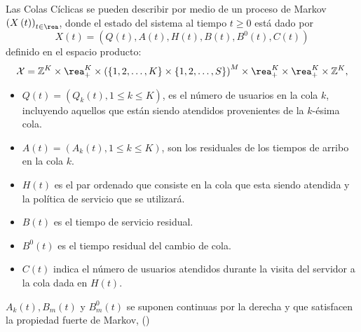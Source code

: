 Las Colas C\'iclicas se pueden describir por medio de un proceso
de Markov $\left(X\left(t\right)\right)_{t\in\rea}$, donde el
estado del sistema al tiempo $t\geq0$ est\'a dado por
\begin{equation}
X\left(t\right)=\left(Q\left(t\right),A\left(t\right),H\left(t\right),B\left(t\right),B^{0}\left(t\right),C\left(t\right)\right)
\end{equation}
definido en el espacio producto:
\begin{equation}
\mathcal{X}=\mathbb{Z}^{K}\times\rea_{+}^{K}\times\left(\left\{1,2,\ldots,K\right\}\times\left\{1,2,\ldots,S\right\}\right)^{M}\times\rea_{+}^{K}\times\rea_{+}^{K}\times\mathbb{Z}^{K},
\end{equation}

\begin{itemize}
\item $Q\left(t\right)=\left(Q_{k}\left(t\right),1\leq k\leq
K\right)$, es el n\'umero de usuarios en la cola $k$, incluyendo
aquellos que est\'an siendo atendidos provenientes de la
$k$-\'esima cola.

\item $A\left(t\right)=\left(A_{k}\left(t\right),1\leq k\leq
K\right)$, son los residuales de los tiempos de arribo en la cola
$k$. \item $H\left(t\right)$ es el par ordenado que consiste en la
cola que esta siendo atendida y la pol\'itica de servicio que se
utilizar\'a.

\item $B\left(t\right)$ es el tiempo de servicio residual.

\item $B^{0}\left(t\right)$ es el tiempo residual del cambio de
cola.

\item $C\left(t\right)$ indica el n\'umero de usuarios atendidos
durante la visita del servidor a la cola dada en
$H\left(t\right)$.
\end{itemize}

$A_{k}\left(t\right),B_{m}\left(t\right)$ y
$B_{m}^{0}\left(t\right)$ se suponen continuas por la derecha y
que satisfacen la propiedad fuerte de Markov, (\cite{Dai})

